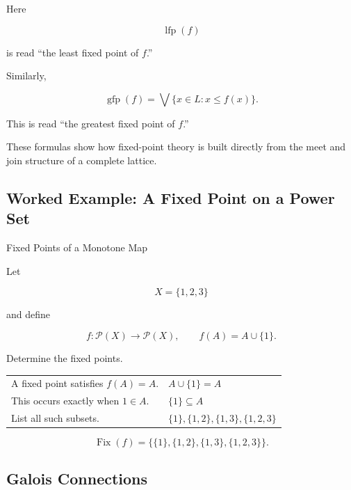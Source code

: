 Here

\[ \operatorname{lfp}(f) \]

is read ``the least fixed point of \(f\).''

Similarly,

\[ \operatorname{gfp}(f)
=\bigvee\{x\in L:x\leq f(x)\}. \]

This is read ``the greatest fixed point of \(f\).''

These formulas show how fixed-point theory is built directly from the meet
and join structure of a complete lattice.

\subsection{Worked Example: A Fixed Point on a Power Set}
\label{subsec:worked-lattice-fixed-point}

\begin{workedexamplebox}{Fixed Points of a Monotone Map}

Let

\[ X=\{1,2,3\} \]

and define

\[ f:\mathcal P(X)\to\mathcal P(X),\qquad f(A)=A\cup\{1\}. \]

Determine the fixed points.

\begin{tabularx}{\textwidth}{@{}>{\raggedright\arraybackslash}p{}X@{}}
A fixed point satisfies \(f(A)=A\). &
\(A\cup\{1\}=A\)\\
This occurs exactly when \(1\in A\). &
\(\{1\}\subseteq A\)\\
List all such subsets. &
\(\{1\},\{1,2\},\{1,3\},\{1,2,3\}\)
\end{tabularx}

\begin{answerbox}
\[ \boxed{\operatorname{Fix}(f)
=\bigl\{\{1\},\{1,2\},\{1,3\},\{1,2,3\}\bigr\}.} \]
\end{answerbox}
\end{workedexamplebox}

\subsection{Galois Connections}
\label{subsec:lattice-galois-connections}

